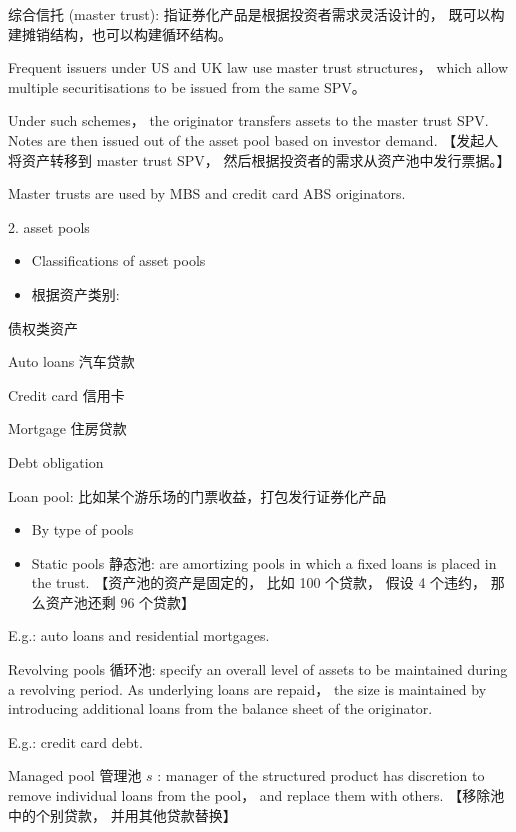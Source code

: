 综合信托 (master trust): 指证券化产品是根据投资者需求灵活设计的， 既可以构建摊销结构，也可以构建循环结构。

Frequent issuers under US and UK law use master trust structures， which allow multiple securitisations to be issued from the same SPV。

Under such schemes， the originator transfers assets to the master trust SPV. Notes are then issued out of the asset pool based on investor demand. 【发起人将资产转移到 master trust SPV， 然后根据投资者的需求从资产池中发行票据。】

Master trusts are used by MBS and credit card ABS originators.

2. asset pools

\begin{itemize}
\item Classifications of asset pools
\end{itemize}

\begin{itemize}
\item 根据资产类别:
\end{itemize}

 债权类资产

Auto loans 汽车贷款

Credit card 信用卡

Mortgage 住房贷款

Debt obligation

 Loan pool: 比如某个游乐场的门票收益，打包发行证券化产品

\begin{itemize}
\item By type of pools
\end{itemize}

\begin{itemize}
\item Static pools 静态池: are amortizing pools in which a fixed loans is placed in the trust. 【资产池的资产是固定的， 比如 100 个贷款， 假设 4 个违约， 那么资产池还剩 96 个贷款】
\end{itemize}

E.g.: auto loans and residential mortgages.

Revolving pools 循环池: specify an overall level of assets to be maintained during a revolving period. As underlying loans are repaid， the size is maintained by introducing additional loans from the balance sheet of the originator.

E.g.: credit card debt.

Managed pool 管理池 \(s\) : manager of the structured product has discretion to remove individual loans from the pool， and replace them with others. 【移除池中的个别贷款， 并用其他贷款替换】

